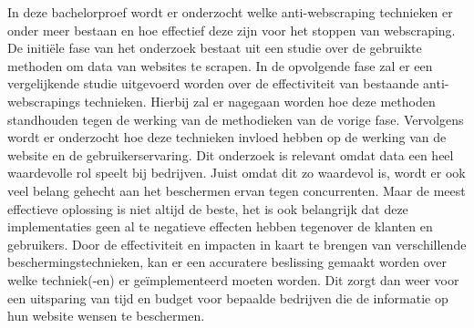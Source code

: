 In deze bachelorproef wordt er onderzocht welke anti-webscraping technieken er onder meer bestaan en hoe effectief deze zijn voor het stoppen van webscraping. \newline 
De initiële fase van het onderzoek bestaat uit een studie over de gebruikte methoden om data van websites te scrapen.
In de opvolgende fase zal er een vergelijkende studie uitgevoerd worden over de effectiviteit van bestaande anti-webscrapings technieken. Hierbij zal er nagegaan worden hoe deze methoden standhouden tegen de werking van de methodieken van de vorige fase.
Vervolgens wordt er onderzocht hoe deze technieken invloed hebben op de werking van de website en de gebruikerservaring.
\newline
Dit onderzoek is relevant omdat data een heel waardevolle rol speelt bij bedrijven. Juist omdat dit zo waardevol is, wordt er ook veel belang gehecht aan het beschermen ervan tegen concurrenten. Maar de meest effectieve oplossing is niet altijd de beste, het is ook belangrijk dat deze implementaties geen al te negatieve effecten hebben tegenover de klanten en gebruikers. Door de effectiviteit en impacten in kaart te brengen van verschillende beschermingstechnieken, kan er een accuratere beslissing gemaakt worden over welke techniek(-en) er geïmplementeerd moeten worden. Dit zorgt dan weer voor een uitsparing van tijd en budget voor bepaalde bedrijven die de  informatie op hun website wensen te beschermen.
